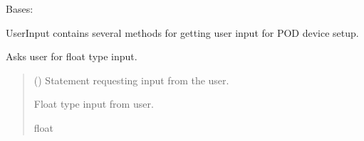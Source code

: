 \documentclass[letterpaper,10pt,english]{sphinxmanual}
\begin{document}
\begin{fulllineitems}
\label{\detokenize{GetUserInput:GetUserInput.UserInput}}
\pysigstartsignatures
{}
\pysigstopsignatures
\sphinxAtStartPar
Bases: 

\sphinxAtStartPar
UserInput contains several methods for getting user input for POD device setup.

\begin{fulllineitems}
\label{\detokenize{GetUserInput:GetUserInput.UserInput.AskForFloat}}
\pysigstartsignatures
{}
\pysigstopsignatures
\sphinxAtStartPar
Asks user for float type input.
\begin{quote}\begin{description}
\sphinxAtStartPar
{} () \textendash{} Statement requesting input from the user.

\sphinxAtStartPar
Float type input from user.

\sphinxAtStartPar
float

\end{description}\end{quote}

\end{fulllineitems}



\end{fulllineitems}
\end{document}
